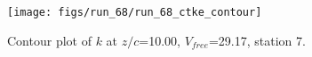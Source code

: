 \begin{figure}[H]
\centering
\texttt{[image: figs/run\_68/run\_68\_ctke\_contour]}
\caption{Contour plot of $k$ at $z/c$=10.00, $V_{free}$=29.17, station 7.}
\label{fig:run_68_ctke_contour}
\end{figure}


